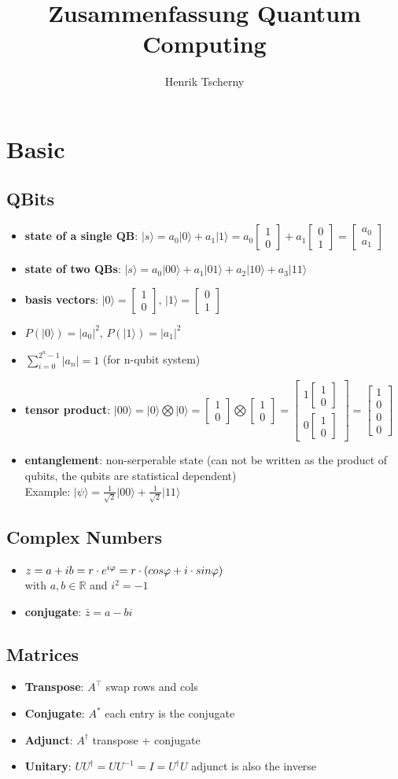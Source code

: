 \documentclass[12pt,a4paper]{article}
\title{Zusammenfassung Quantum Computing}
\author{Henrik Tscherny}
\newcommand{\ket}[1]{\vert #1 \rangle}
\newcommand*\vv[2]{
    \begin{bmatrix}#1\\#2\end{bmatrix}
}
\newcommand*\vvvv[4]{
    \begin{bmatrix}#1\\#2\\#3\\#4\end{bmatrix}
}
\begin{document}
\maketitle
\tableofcontents

\section{Basic}
\subsection{QBits}
\begin{itemize}
\item \textbf{state of a single QB}: $\ket{s} = a_0 \ket{0} + a_1 \ket{1} = a_0 \vv{1}{0} + a_1 \vv{0}{1} = \vv{a_0}{a_1}$
\item \textbf{state of two QBs}: $\ket{s} = a_0 \ket{00} + a_1 \ket{01} + a_2 \ket{10} + a_3 \ket{11}$
\item \textbf{basis vectors}: $\ket{0} = \vv{1}{0}$,  $\ket{1} = \vv{0}{1}$
\item $P(\ket{0}) = |a_0|^2$, $P(\ket{1}) = |a_1|^2$
\item $\displaystyle \sum_{i=0}^{2^n-1} |a_n| = 1$ (for n-qubit system)
\item \textbf{tensor product}: $\ket{00} = \ket{0} \bigotimes \ket{0} = \vv{1}{0} \bigotimes \vv{1}{0} = \vv{1\vv{1}{0}}{0\vv{1}{0}} = \vvvv{1}{0}{0}{0}$
\item \textbf{entanglement}: non-serperable state (can not be written as the product of qubits, the qubits are statistical dependent)\\
Example: $\ket{\psi} = \frac{1}{\sqrt{2}}\ket{00} + \frac{1}{\sqrt{2}}\ket{11}$
\end{itemize}

\subsection{Complex Numbers}
\begin{itemize}
\item $z = a + ib\\= r \cdot e^{i\varphi}\\= r\cdot (cos \varphi + i \cdot sin \varphi)$\\with $a,b \in \mathbb{R}$ and $i^2 = -1$
\item \textbf{conjugate}: $\bar{z}= a-bi$
\end{itemize}

\subsection{Matrices}
\begin{itemize}
\item \textbf{Transpose}: $A^\top$ swap rows and cols
\item \textbf{Conjugate}: $A^*$ each entry is the conjugate
\item \textbf{Adjunct}: $A^\dagger$ transpose + conjugate
\item \textbf{Unitary}: $UU^\dagger = UU^{-1} = I = U^\dagger U$ adjunct is also the inverse
\end{itemize}
\end{document}

